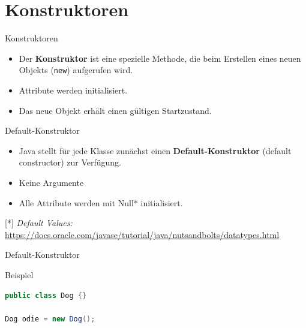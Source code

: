 \documentclass[18pt]{beamer}
\begin{document}
\section{Konstruktoren}

\begin{frame}{Konstruktoren}
    \begin{itemize}
        \item Der \textbf{Konstruktor} ist eine spezielle Methode, die beim Erstellen eines neuen Objekts (\texttt{new}) aufgerufen wird.
        \item Attribute werden initialisiert.
        \item Das neue Objekt erhält einen gültigen Startzustand.
    \end{itemize}
\end{frame}

\begin{frame}{Default-Konstruktor}
    \begin{itemize}
        \item Java stellt für jede Klasse zunächst einen \textbf{Default-Konstruktor} (default constructor) zur Verfügung.
        \item Keine Argumente
        \item Alle Attribute werden mit Null* initialisiert.
    \end{itemize}


    \vspace{.5in}
    [*] \textit{Default Values:} \url{https://docs.oracle.com/javase/tutorial/java/nutsandbolts/datatypes.html}

\end{frame}

\begin{frame}[fragile]{Default-Konstruktor}
    \begin{exampleblock}{Beispiel}
        \begin{lstlisting}[language=Java]
public class Dog {}

Dog odie = new Dog();
        \end{lstlisting}

    \end{exampleblock}

\end{frame}
\end{document}
